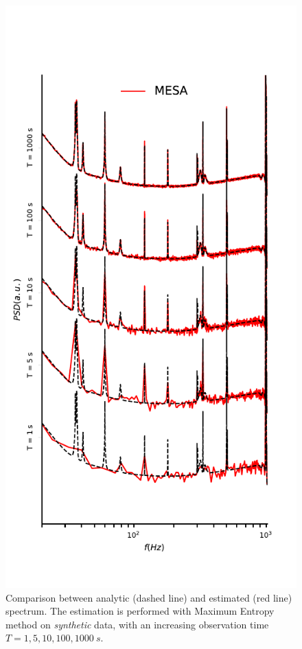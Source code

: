 \documentclass{aa}
\begin{document}
\begin{figure}

\begin{minipage}{0.99\columnwidth}
	\caption{Comparison between analytic (dashed line) and estimated (red line) spectrum. The estimation is performed with Maximum Entropy method on \textit{synthetic} data, with an increasing observation time $T = 1, 5, 10, 100, \SI{1000}{s}$.}
	\label{fig:MESA_LIGO_data}
	\includegraphics{Images/comparison_LVC_data/comparison_LVC_data_MESA.pdf}

\end{minipage}
\end{figure}
\end{document}
